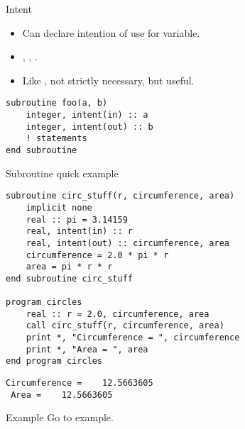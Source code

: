 \begin{frame}[fragile]
  \begin{block}{Intent}\pause
  \begin{itemize}
    \item Can declare intention of use for variable.
    \item {}, , .
    \item Like , not strictly necessary, but useful.
  \end{itemize}
\begin{lstlisting}
subroutine foo(a, b)
    integer, intent(in) :: a
    integer, intent(out) :: b
    ! statements
end subroutine
\end{lstlisting}
  \end{block}
\end{frame}


\begin{frame}[fragile]
  \begin{block}{Subroutine quick example}\pause
\vspace*{-.4cm}
\begin{lstlisting}
subroutine circ_stuff(r, circumference, area)
    implicit none
    real :: pi = 3.14159
    real, intent(in) :: r
    real, intent(out) :: circumference, area
    circumference = 2.0 * pi * r
    area = pi * r * r 
end subroutine circ_stuff

program circles
    real :: r = 2.0, circumference, area
    call circ_stuff(r, circumference, area)
    print *, "Circumference = ", circumference
    print *, "Area = ", area
end program circles
\end{lstlisting}
\vspace{-.2cm}
\begin{lstlisting}[language=shl]
 Circumference =    12.5663605    
 Area =    12.5663605   
\end{lstlisting}
  \end{block}
\end{frame}


\begin{frame}
  \begin{block}{Example}\pause
    Go to example.
  \end{block}
\end{frame}
